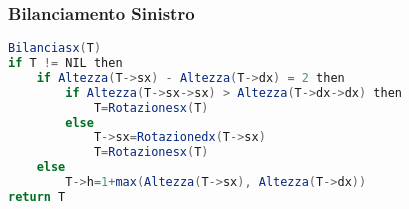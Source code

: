 \subsubsection{Bilanciamento Sinistro}
\begin{lstlisting}[language=Java]
Bilanciasx(T)
if T != NIL then
    if Altezza(T->sx) - Altezza(T->dx) = 2 then
        if Altezza(T->sx->sx) > Altezza(T->dx->dx) then
            T=Rotazionesx(T)
        else 
            T->sx=Rotazionedx(T->sx)
            T=Rotazionesx(T)
    else 
        T->h=1+max(Altezza(T->sx), Altezza(T->dx))
return T
\end{lstlisting}